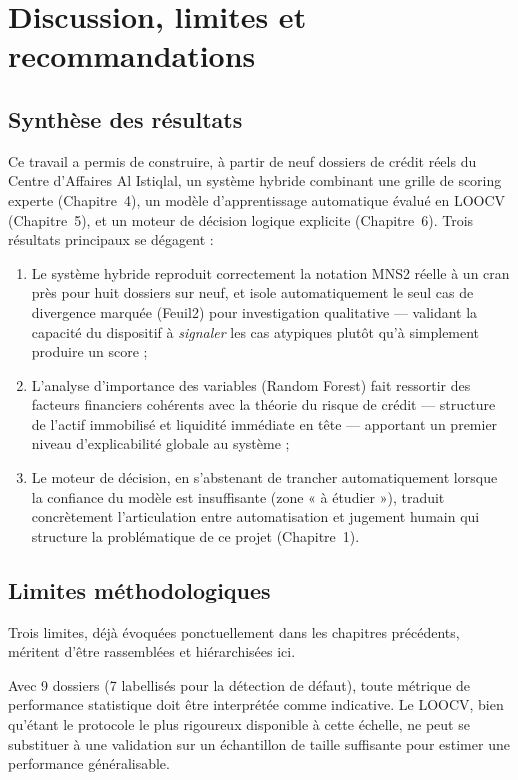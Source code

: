 \chapter{Discussion, limites et recommandations}

\section{Synthèse des résultats}

Ce travail a permis de construire, à partir de neuf dossiers de crédit réels du Centre d'Affaires
Al Istiqlal, un système hybride combinant une grille de scoring experte (Chapitre~4), un modèle
d'apprentissage automatique évalué en LOOCV (Chapitre~5), et un moteur de décision logique
explicite (Chapitre~6). Trois résultats principaux se dégagent :

\begin{enumerate}
    \item Le système hybride reproduit correctement la notation MNS2 réelle à un cran près pour
    huit dossiers sur neuf, et isole automatiquement le seul cas de divergence marquée (Feuil2)
    pour investigation qualitative — validant la capacité du dispositif à \emph{signaler} les cas
    atypiques plutôt qu'à simplement produire un score ;
    \item L'analyse d'importance des variables (Random Forest) fait ressortir des facteurs
    financiers cohérents avec la théorie du risque de crédit — structure de l'actif immobilisé et
    liquidité immédiate en tête — apportant un premier niveau d'explicabilité globale au système ;
    \item Le moteur de décision, en s'abstenant de trancher automatiquement lorsque la confiance
    du modèle est insuffisante (zone « à étudier »), traduit concrètement l'articulation entre
    automatisation et jugement humain qui structure la problématique de ce projet (Chapitre~1).
\end{enumerate}

\section{Limites méthodologiques}

Trois limites, déjà évoquées ponctuellement dans les chapitres précédents, méritent d'être
rassemblées et hiérarchisées ici.

\begin{limite}
Avec 9 dossiers (7 labellisés pour la détection de défaut), toute métrique de performance
statistique doit être interprétée comme indicative. Le LOOCV, bien qu'étant le protocole le plus
rigoureux disponible à cette échelle, ne peut se substituer à une validation sur un échantillon
de taille suffisante pour estimer une performance généralisable.
\end{limite}

